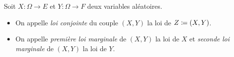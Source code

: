 \documentclass{magnolia}
\begin{document}




\begin{definition}
Soit $X:\Omega\to E$ et $Y:\Omega\to F$ deux variables aléatoires.
\begin{itemize}
\item  On appelle \emph{loi conjointe} du couple $(X,Y)$ la loi de $Z\coloneqq (X,Y)$.
\item  On appelle \emph{première loi marginale} de $(X,Y)$ la loi de $X$ et
\emph{seconde loi marginale} de $(X,Y)$ la loi de $Y$.
\end{itemize}
\end{definition}
\end{document}
